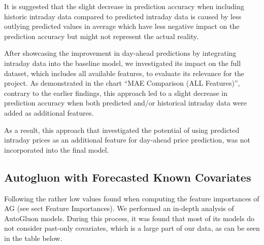 \documentclass[a4paper]{article}
\begin{document}
It is suggested that the slight decrease in prediction accuracy when
including historic intraday data compared to predicted intraday data is
caused by less outlying predicted values in average which have less
negative impact on the prediction accuracy but might not represent the
actual reality.

After showcasing the improvement in day-ahead predictions by integrating
intraday data into the baseline model, we investigated its impact on the
full dataset, which includes all available features, to evaluate its
relevance for the project. As demonstrated in the chart ``MAE Comparison
(ALL Features)'', contrary to the earlier findings, this approach led to
a slight decrease in prediction accuracy when both predicted and/or
historical intraday data were added as additional features.

As a result, this approach that investigated the potential of using
predicted intraday prices as an additional feature for day-ahead price
prediction, was not incorporated into the final model.

    \subsection{Autogluon with Forecasted Known
Covariates}\label{autogluon-with-forecasted-known-covariates}

Following the rather low values found when computing the feature
importances of AG (see sect Feature Importances). We performed an
in-depth analysis of AutoGluon models. During this process, it was found
that most of its models do not consider past-only covariates, which is a
large part of our data, as can be seen in the table below.
\end{document}

